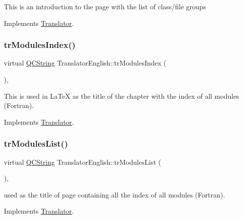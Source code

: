 This is an introduction to the page with the list of class/file groups 

Implements \mbox{\hyperlink{class_translator}{Translator}}.

\mbox{\label{class_translator_english_ad925c638d4c4aa994cb453449f34a1aa}} 
\subsubsection{\texorpdfstring{trModulesIndex()}{trModulesIndex()}}
{\footnotesize\ttfamily virtual \mbox{\hyperlink{class_q_c_string}{Q\+C\+String}} Translator\+English\+::tr\+Modules\+Index (\begin{DoxyParamCaption}{ }\end{DoxyParamCaption})\hspace{0.3cm}{\ttfamily [inline]}, {\ttfamily [virtual]}}

This is used in La\+TeX as the title of the chapter with the index of all modules (Fortran). 

Implements \mbox{\hyperlink{class_translator}{Translator}}.

\mbox{\label{class_translator_english_a4bdd283d23248fc39882d73c6b32a965}} 
\subsubsection{\texorpdfstring{trModulesList()}{trModulesList()}}
{\footnotesize\ttfamily virtual \mbox{\hyperlink{class_q_c_string}{Q\+C\+String}} Translator\+English\+::tr\+Modules\+List (\begin{DoxyParamCaption}{ }\end{DoxyParamCaption})\hspace{0.3cm}{\ttfamily [inline]}, {\ttfamily [virtual]}}

used as the title of page containing all the index of all modules (Fortran). 

Implements \mbox{\hyperlink{class_translator}{Translator}}.

\mbox{\label{class_translator_english_a2595f79a1eb322d912643e60e3f9c688}} 
